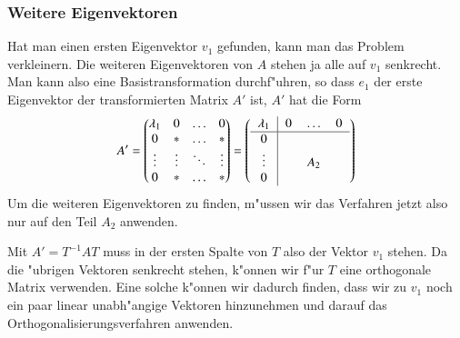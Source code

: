 \subsubsection{Weitere Eigenvektoren}
Hat man einen ersten Eigenvektor $v_1$ gefunden,
kann man das Problem verkleinern.
Die weiteren Eigenvektoren von $A$ stehen ja alle auf  $v_1$
senkrecht. Man kann also eine Basistransformation
durchf"uhren, so dass $e_1$ der erste Eigenvektor der transformierten
Matrix $A'$ ist, $A'$ hat die Form
\[
A'=\begin{pmatrix}
\lambda_1&0&\dots&0\\
0&*&\dots&*\\
\vdots&\vdots&\ddots&\vdots\\
0&*&\dots&*
\end{pmatrix}
=
\left(
\begin{tabular}{>{$}c<{$}|>{$}c<{$}>{$}c<{$}>{$}c<{$}}
\lambda_1&0&\dots&0\\
\hline
0&&&\\
\vdots&&A_2&\\
0&&&
\end{tabular}
\right)
\]
Um die weiteren Eigenvektoren zu finden, m"ussen wir das Verfahren jetzt
also nur auf den Teil $A_2$ anwenden.

Mit $A'=T^{-1}AT$ muss in der ersten Spalte von $T$
also der Vektor $v_1$ stehen.
Da die "ubrigen Vektoren senkrecht stehen,
k"onnen wir f"ur $T$ eine orthogonale Matrix verwenden. Eine solche
k"onnen wir dadurch finden, dass wir zu $v_1$ noch ein paar linear
unabh"angige Vektoren hinzunehmen und darauf das Orthogonalisierungsverfahren
anwenden.


